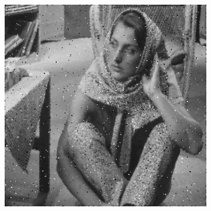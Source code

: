 \documentclass[12pt,a4paper]{report}
\begin{document}
\begin{figure}[!htb]
\begin{minipage}{\linewidth}
\begin{subfigure}{0.49\textwidth}
      \includegraphics[width=\linewidth]{output/noise1_q2_K3P1.png}
    \end{subfigure}


\end{minipage}
\end{figure}
\end{document}
